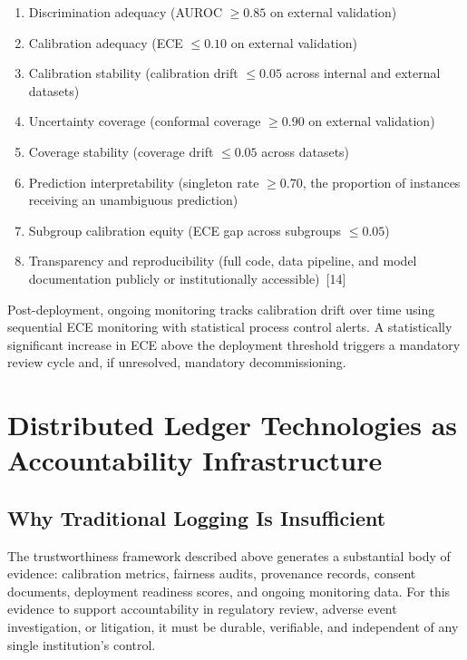 \begin{enumerate}
\def\labelenumi{\arabic{enumi}.}
\tightlist
\item
  Discrimination adequacy (AUROC $\geq 0.85$ on external validation)
\item
  Calibration adequacy (ECE $\leq 0.10$ on external validation)
\item
  Calibration stability (calibration drift $\leq 0.05$ across internal
  and external datasets)
\item
  Uncertainty coverage (conformal coverage $\geq 0.90$ on external
  validation)
\item
  Coverage stability (coverage drift $\leq 0.05$ across datasets)
\item
  Prediction interpretability (singleton rate $\geq 0.70$, the
  proportion of instances receiving an unambiguous prediction)
\item
  Subgroup calibration equity (ECE gap across subgroups $\leq 0.05$)
\item
  Transparency and reproducibility (full code, data pipeline, and model
  documentation publicly or institutionally accessible)~{[}14{]}
\end{enumerate}

Post-deployment, ongoing monitoring tracks calibration drift over time
using sequential ECE monitoring with statistical process control alerts.
A statistically significant increase in ECE above the deployment
threshold triggers a mandatory review cycle and, if unresolved,
mandatory decommissioning.


\section{Distributed Ledger Technologies as Accountability
Infrastructure}\label{distributed-ledger-technologies-as-accountability-infrastructure}

\subsection{Why Traditional Logging Is
Insufficient}\label{why-traditional-logging-is-insufficient}

The trustworthiness framework described above generates a substantial
body of evidence: calibration metrics, fairness audits, provenance
records, consent documents, deployment readiness scores, and ongoing
monitoring data. For this evidence to support accountability in
regulatory review, adverse event investigation, or litigation, it must
be durable, verifiable, and independent of any single institution's
control.

